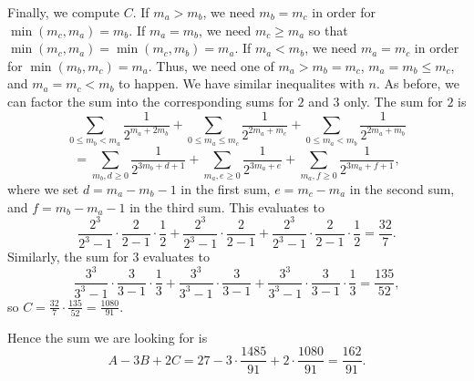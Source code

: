Finally, we compute $C$. If $m_a>m_b$, we need $m_b=m_c$ in order for $\min\left(m_c,m_a\right)=m_b$. If $m_a=m_b$, we need $m_c\geq m_a$ so that $\min\left(m_c,m_a\right)=\min\left(m_c,m_b\right)=m_a$. If $m_a<m_b$, we need $m_a=m_c$ in order for $\min\left(m_b,m_c\right)=m_a$. Thus, we need one of $m_a>m_b=m_c$, $m_a=m_b\leq m_c$, and $m_a=m_c<m_b$ to happen. We have similar inequalites with $n$. As before, we can factor the sum into the corresponding sums for $2$ and $3$ only. The sum for $2$ is \[\displaystyle\sum_{0\leq m_b<m_a}\frac{1}{2^{m_a+2m_b}}+\displaystyle\sum_{0\leq m_a\leq m_c}\frac{1}{2^{2m_a+m_c}}+\displaystyle\sum_{0\leq m_a<m_b}\frac{1}{2^{2m_a+m_b}}\]\[=\displaystyle\sum_{m_b,d\geq0}\frac{1}{2^{3m_b+d+1}}+\displaystyle\sum_{m_a,e\geq0}\frac{1}{2^{3m_a+e}}+\displaystyle\sum_{m_a,f\geq0}\frac{1}{2^{3m_a+f+1}},\] where we set $d=m_a-m_b-1$ in the first sum, $e=m_c-m_a$ in the second sum, and $f=m_b-m_a-1$ in the third sum. This evaluates to \[\frac{2^3}{2^3-1}\cdot\frac{2}{2-1}\cdot\frac{1}{2}+\frac{2^3}{2^3-1}\cdot\frac{2}{2-1}+\frac{2^3}{2^3-1}\cdot\frac{2}{2-1}\cdot\frac{1}{2}=\frac{32}{7}.\] Similarly, the sum for $3$ evaluates to \[\frac{3^3}{3^3-1}\cdot\frac{3}{3-1}\cdot\frac{1}{3}+\frac{3^3}{3^3-1}\cdot\frac{3}{3-1}+\frac{3^3}{3^3-1}\cdot\frac{3}{3-1}\cdot\frac{1}{3}=\frac{135}{52},\] so $C=\frac{32}{7}\cdot\frac{135}{52}=\frac{1080}{91}$.

Hence the sum we are looking for is \[A-3B+2C=27-3\cdot\frac{1485}{91}+2\cdot\frac{1080}{91}=\boxed{\frac{162}{91}}.\]